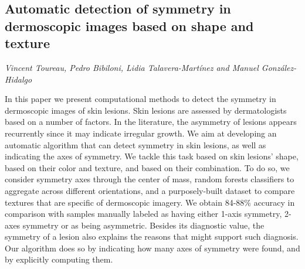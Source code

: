 \documentclass[../booklet.tex]{subfiles}
\begin{document}
\subsection[Automatic detection of symmetry in dermoscopic images based on shape and texture. {\it Vincent Toureau, Pedro Bibiloni, Lidia Talavera-Martínez and Manuel González-Hidalgo}]{Automatic detection of symmetry in dermoscopic images based on shape and texture}
   

\begin{center}
  {\it Vincent Toureau, Pedro Bibiloni, Lidia Talavera-Martínez and Manuel González-Hidalgo}
\end{center}



In this paper we present computational methods to detect the symmetry in dermoscopic images of skin lesions.
Skin lesions are assessed by dermatologists based on a number of factors.
In the literature, the asymmetry of lesions appears recurrently since it may indicate irregular growth.
We aim at developing an automatic algorithm that can detect symmetry in skin lesions, as well as indicating the axes of symmetry.
We tackle this task based on skin lesions' shape, based on their color and texture, and based on their combination.
To do so, we consider symmetry axes through the center of mass, random forests classifiers to aggregate across different orientations, and a purposely-built dataset to compare textures that are specific of dermoscopic imagery.
We obtain 84-88\% accuracy in comparison with samples manually labeled as having either 1-axis symmetry, 2-axes symmetry or as being asymmetric.
Besides its diagnostic value, the symmetry of a lesion also explains the reasons that might support such diagnosis.
Our algorithm does so by indicating how many axes of symmetry were found, and by explicitly computing them.

\end{document}
